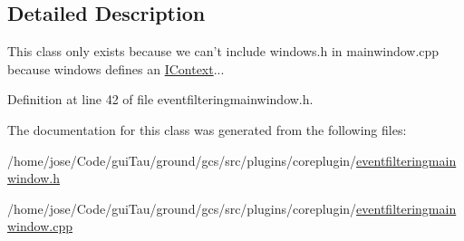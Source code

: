 \subsection{Detailed Description}
This class only exists because we can't include windows.\-h in mainwindow.\-cpp because windows defines an \hyperlink{class_core_1_1_i_context}{I\-Context}... 

Definition at line 42 of file eventfilteringmainwindow.\-h.



The documentation for this class was generated from the following files\-:\begin{DoxyCompactItemize}
\item 
/home/jose/\-Code/gui\-Tau/ground/gcs/src/plugins/coreplugin/\hyperlink{eventfilteringmainwindow_8h}{eventfilteringmainwindow.\-h}\item 
/home/jose/\-Code/gui\-Tau/ground/gcs/src/plugins/coreplugin/\hyperlink{eventfilteringmainwindow_8cpp}{eventfilteringmainwindow.\-cpp}\end{DoxyCompactItemize}
